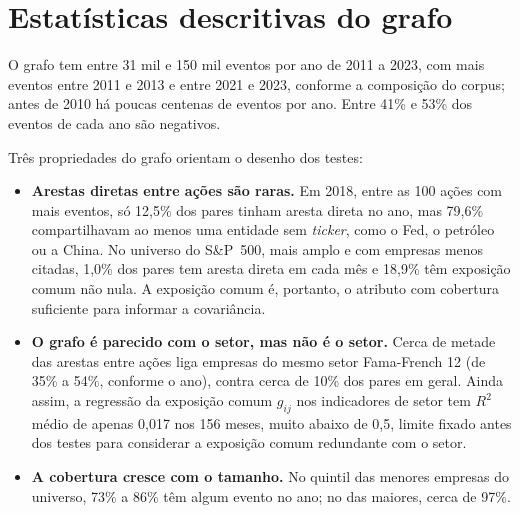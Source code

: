 \section{Estatísticas descritivas do grafo}
\label{sec:descritivas}

O grafo tem entre 31 mil e 150 mil eventos por ano de 2011 a 2023, com mais eventos entre 2011 e 2013 e
entre 2021 e 2023, conforme a composição do corpus; antes de 2010 há poucas centenas de eventos por ano.
Entre 41\% e 53\% dos eventos de cada ano são negativos.

Três propriedades do grafo orientam o desenho dos testes:
\begin{itemize}
  \item \textbf{Arestas diretas entre ações são raras.} Em 2018, entre as 100 ações com mais eventos,
        só 12,5\% dos pares tinham aresta direta no ano, mas 79,6\% compartilhavam ao menos uma
        entidade sem \emph{ticker}, como o Fed, o petróleo ou a China. No universo do S\&P~500, mais
        amplo e com empresas menos citadas, 1,0\% dos pares tem aresta direta em cada mês e 18,9\% têm
        exposição comum não nula. A exposição comum é, portanto, o atributo com cobertura suficiente
        para informar a covariância.
  \item \textbf{O grafo é parecido com o setor, mas não é o setor.} Cerca de metade das arestas entre
        ações liga empresas do mesmo setor Fama-French 12 (de 35\% a 54\%, conforme o ano), contra cerca de 10\% dos
        pares em geral. Ainda assim, a regressão da exposição comum $g_{ij}$ nos indicadores de setor
        tem $R^2$ médio de apenas 0,017 nos 156 meses, muito abaixo de 0,5, limite fixado antes dos
        testes para considerar a exposição comum redundante com o setor.
  \item \textbf{A cobertura cresce com o tamanho.} No quintil das menores empresas do universo, 73\% a
        86\% têm algum evento no ano; no das maiores, cerca de 97\%.
\end{itemize}

\clearpage
